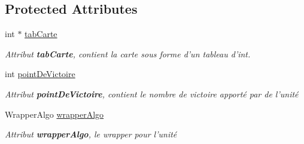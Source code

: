 \subsection*{Protected Attributes}
\begin{DoxyCompactItemize}
\item 
\hypertarget{class_small_world_1_1_unite_aa61e8641b297e41d476c208b1167f5af}{int $\ast$ \hyperlink{class_small_world_1_1_unite_aa61e8641b297e41d476c208b1167f5af}{tab\-Carte}}\label{class_small_world_1_1_unite_aa61e8641b297e41d476c208b1167f5af}

\begin{DoxyCompactList}\small\item\em Attribut {\bfseries tab\-Carte}, contient la carte sous forme d'un tableau d'int. \end{DoxyCompactList}\item 
\hypertarget{class_small_world_1_1_unite_a81c19be68e5ba1ced9da2807ff6d8b1d}{int \hyperlink{class_small_world_1_1_unite_a81c19be68e5ba1ced9da2807ff6d8b1d}{point\-De\-Victoire}}\label{class_small_world_1_1_unite_a81c19be68e5ba1ced9da2807ff6d8b1d}

\begin{DoxyCompactList}\small\item\em Attribut {\bfseries point\-De\-Victoire}, contient le nombre de victoire apporté par de l'unité \end{DoxyCompactList}\item 
\hypertarget{class_small_world_1_1_unite_ae31420a2b11cfa8c18458c1b74a3362f}{Wrapper\-Algo \hyperlink{class_small_world_1_1_unite_ae31420a2b11cfa8c18458c1b74a3362f}{wrapper\-Algo}}\label{class_small_world_1_1_unite_ae31420a2b11cfa8c18458c1b74a3362f}

\begin{DoxyCompactList}\small\item\em Attribut {\bfseries wrapper\-Algo}, le wrapper pour l'unité \end{DoxyCompactList}\end{DoxyCompactItemize}
